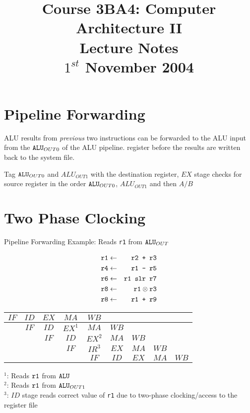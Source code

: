 \documentclass[a4paper,12pt]{article}
\begin{document}
\title{Course 3BA4: Computer Architecture II \\ Lecture Notes \\ $1^{st}$ November 2004}

\maketitle

\section*{Pipeline Forwarding}

ALU results from \emph{previous} two instructions can be forwarded to
the ALU input from the $\verb!ALU!_{OUT 0}$ of the ALU pipeline. register before
the results are written back to the system file.

Tag $\verb!ALU!_{OUT 0}$ and $ALU_{OUT 1}$ with the destination register, $EX$
stage checks for source register in the order $\verb!ALU!_{OUT 0}$, $ALU_{OUT 1}$
and then $A/B$

\section*{Two Phase Clocking}

Pipeline Forwarding Example: Reads \verb!r1! from $\verb!ALU!_{OUT}$

\begin{eqnarray*}
\verb!r1!	&	\leftarrow	&	\verb!r2 + r3!	\\
\verb!r4!	&	\leftarrow	&	\verb!r1 - r5!	\\
\verb!r6!	&	\leftarrow	&	\verb!r1 slr r7!\\
\verb!r8!	&	\leftarrow	&	\verb!r1! \otimes \verb!r3!	\\
\verb!r8!	&	\leftarrow	&	\verb!r1 + r9!	\\
\end{eqnarray*}


\begin{tabular}{|c|c|c|c|c|c|c|c|c|}
$IF$	&	$ID$	&	$EX$	&	$MA$		&	$WB$		&			&			&			&			\\
\hline
		&	$IF$	&	$ID$	&	$EX^{1}$	&	$MA$		&	$WB$	&			&			&			\\
		&			&	$IF$	&	$ID$		&	$EX^{2}$	&	$MA$	&	$WB$	&			&			\\
		&			&			&	$IF$		&	$IR^{3}$	&	$EX$	&	$MA$	&	$WB$	&			\\
		&			&			&				&	$IF$		&	$ID$	&	$EX$	&	$MA$	&	$WB$	\\
\end{tabular}

$^{1}$: Reads $\verb!r1!$ from $\verb!ALU!$ \\
$^{2}$: Reads $\verb!r1!$ from $\verb!ALU!_{OUT 1}$ \\
$^{3}$: $ID$ stage reads correct value of \verb!r1! due to two-phase clocking/access 
to the register file
\end{document}
